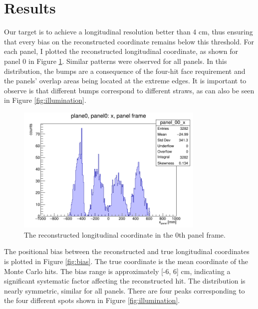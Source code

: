 \section{Results}

Our target is to achieve a longitudinal resolution better than 4 cm, thus ensuring that every bias on the reconstructed coordinate 
remains below this threshold. For each panel, I plotted the reconstructed longitudinal coordinate, as shown for panel 0 in Figure \ref{fig:recx}. 
Similar patterns were observed for all panels. In this distribution, the bumps are a consequence of the four-hit face requirement and the panels' overlap areas being located at the extreme edges. 
It is important to observe is that different bumps correspond to different straws, as can also be seen in Figure \ref{fig:illumination}.
\begin{figure}[!h]
    \centering
    \includegraphics[width=0.8\textwidth]{figures/png/x_panel0.png}
    \caption[The reconstructed longitudinal coordinate in the 0th panel frame.]{The reconstructed longitudinal coordinate in the 0th panel frame.}
    \label{fig:recx}
\end{figure}
The positional bias between the reconstructed and true longitudinal coordinates is plotted in 
Figure \ref{fig:bias}. The true coordinate is the mean coordinate of the Monte Carlo hits. The bias range is approximately [-6, 6] cm, 
indicating a significant systematic factor affecting the reconstructed hit. The distribution is nearly symmetric, similar for all panels. 
There are four peaks corresponding to the four different spots shown in Figure \ref{fig:illumination}.

